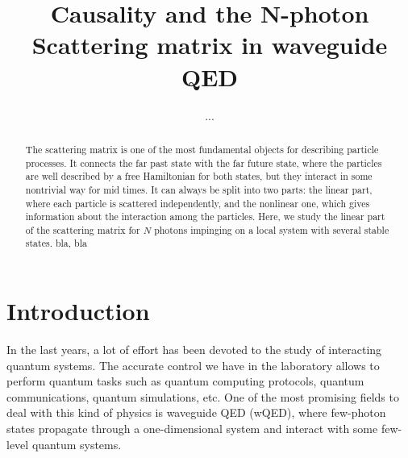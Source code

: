 \documentclass[aps,pra,reprint,amsmath,amssymb]{revtex4-1}
\begin{document}
\title{Causality and the N-photon Scattering matrix in waveguide QED}

\author{...}


\begin{abstract}
The scattering matrix is one of the most fundamental objects for
describing particle processes. It connects the far past state with the
far future state, where the particles are well described by a free
Hamiltonian for both states, but they interact in some nontrivial way
for mid times. It can always be split into two parts: the linear part,
where each particle is scattered independently, and the nonlinear one,
which gives information about the interaction among the
particles. Here, we study the linear part of the scattering matrix for
$N$ photons impinging on a local system with several stable states. 
bla, bla
\end{abstract}



\maketitle


\section{Introduction}

In the last years, a lot of effort has been devoted to the study of interacting quantum systems. The accurate control we have in the laboratory allows to perform quantum tasks such as quantum computing protocols, quantum communications, quantum simulations, etc. One of the most promising fields to deal with this kind of physics is waveguide QED (wQED), where few-photon states propagate through a one-dimensional system and interact with some few-level quantum systems. \cite{fan10,Xu2015,Xu2016,Sanchez-Burillo2015,Sanchez-Burillo2016}
\end{document}
